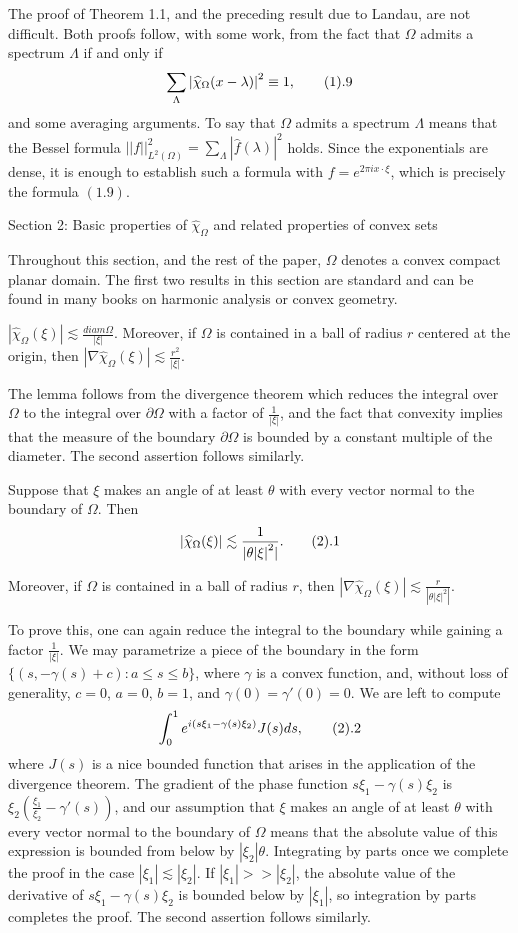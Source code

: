 The proof of Theorem 1.1, and the preceding result due to
Landau, are not difficult. Both proofs follow, with some work,
from the fact that $\Omega$ admits a spectrum $\Lambda$ if and
only if $$ \sum_{\Lambda}
{|\widehat{\chi}_{\Omega}(x-\lambda)|}^2 \equiv 1, \tag1.9$$ and
some averaging arguments. To say that $\Omega$ admits a spectrum
$\Lambda$ means that the Bessel formula
${||f||}_{L^2(\Omega)}^2=\sum_{\Lambda} {|\hat{f}(\lambda)|}^2$
holds. Since the exponentials are dense, it is enough to
establish such a formula with $f=e^{2 \pi i x \cdot\xi}$, which
is precisely the formula $(1.9)$.

\head Section 2: Basic properties of $\widehat{\chi}_{\Omega}$
and related properties of convex sets \endhead

Throughout this section, and the rest of the paper, $\Omega$
denotes a convex compact planar domain. The first two results in
this section are standard and can be found in many books on
harmonic analysis or convex geometry.

 $|\widehat{\chi}_{\Omega}(\xi)| \lesssim
\frac{diam{\Omega}}{|\xi|}$. Moreover, if $\Omega$ is contained
in a ball of radius $r$ centered at the origin, then $|\nabla
\widehat{\chi}_{\Omega}(\xi)| \lesssim \frac{r^2}{|\xi|}$.
\endproclaim

The lemma follows from the divergence theorem which reduces the
integral over $\Omega$ to the integral over $\partial \Omega$
with a factor of $\frac{1}{|\xi|}$, and the fact that convexity
implies that the measure of the boundary $\partial \Omega$ is
bounded by a constant multiple of the diameter. The second
assertion follows similarly.

 Suppose that $\xi$ makes an angle of at least
$\theta$ with every vector normal to the boundary of $\Omega$. Then
$$ |\widehat{\chi}_{\Omega}(\xi)| \lesssim \frac{1}{| \theta {|\xi|}^2|}.
\tag2.1$$

Moreover, if $\Omega$ is contained in a ball of radius $r$,
then $|\nabla \widehat{\chi}_{\Omega}(\xi)|
\lesssim \frac{r}{| \theta {|\xi|}^2|}$.
\endproclaim

To prove this, one can again reduce the integral to the boundary
while gaining a factor $\frac{1}{|\xi|}$. We may parametrize a
piece of the boundary in the form $\{(s, -\gamma(s)+c): a \leq s
\leq b\}$, where  $\gamma$ is a convex function, and, without
loss of generality, $c=0$, $a=0$, $b=1$, and
$\gamma(0)=\gamma'(0)=0$. We are left to compute
$$ \int_{0}^{1} e^{i(s \xi_1-\gamma(s) \xi_2)} J(s)ds, \tag2.2$$
where $J(s)$ is a nice bounded function that arises in the
application of the divergence theorem. The gradient of the phase
function $s \xi_1-\gamma(s) \xi_2$ is $\xi_2 \left(
\frac{\xi_1}{\xi_2}-\gamma'(s) \right)$, and our assumption that
$\xi$ makes an angle of at least $\theta$ with every vector
normal to the boundary of $\Omega$ means that the absolute value
of this expression is bounded from below by $|\xi_2| \theta$.
Integrating by parts once we complete the proof in the case
$|\xi_1| \lesssim |\xi_2|$. If $|\xi_1|>>|\xi_2|$, the absolute
value of the derivative of $s \xi_1-\gamma(s) \xi_2$ is bounded
below by $|\xi_1|$, so integration by parts completes the proof.
The second assertion follows similarly.

